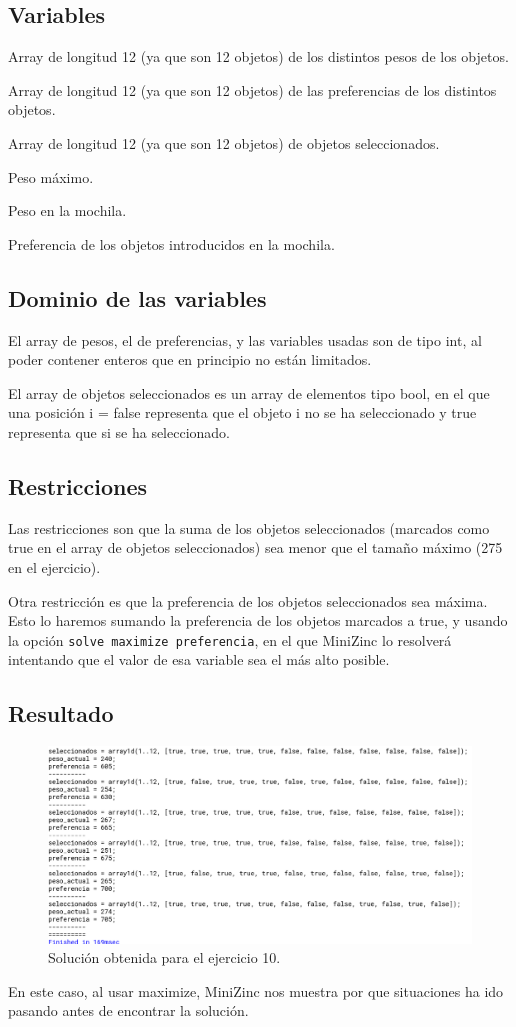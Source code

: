 \documentclass[11pt, spanish]{article}
\begin{document}
\subsection{Variables}

Array de longitud 12 (ya que son 12 objetos) de los distintos pesos de los objetos.

Array de longitud 12 (ya que son 12 objetos) de las preferencias de los distintos objetos.

Array de longitud 12 (ya que son 12 objetos) de objetos seleccionados.

Peso máximo.

Peso en la mochila.

Preferencia de los objetos introducidos en la mochila.

\subsection{Dominio de las variables}

El array de pesos, el de preferencias, y las variables usadas son de tipo int, al poder contener enteros que en principio no están limitados.

El array de objetos seleccionados es un array de elementos tipo bool, en el que una posición i = false representa que el objeto i no se ha seleccionado y true representa que si se ha seleccionado.

\subsection{Restricciones}

Las restricciones son que la suma de los objetos seleccionados (marcados como true en el array de objetos seleccionados) sea menor que el tamaño máximo (275 en el ejercicio).

Otra restricción es que la preferencia de los objetos seleccionados sea máxima. Esto lo haremos sumando la preferencia de los objetos marcados a true, y usando la opción \texttt{solve maximize preferencia}, en el que MiniZinc lo resolverá intentando que el valor de esa variable sea el más alto posible.

\subsection{Resultado}

\begin{figure}[H]
  \centering
      \includegraphics[scale = 0.30]{sol10.png}
 		 \caption{Solución obtenida para el ejercicio 10.}
  		\label{fig:ej10}

\end{figure}

En este caso, al usar maximize, MiniZinc nos muestra por que situaciones ha ido pasando antes de encontrar la solución.
\end{document}
